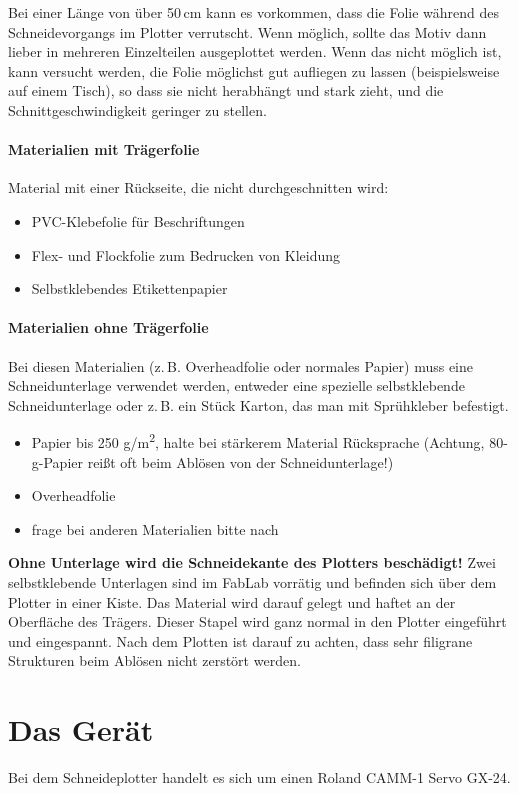 \documentclass{\basedir/fablab-document}
\begin{document}
Bei einer Länge von über 50\,cm kann es vorkommen, dass die Folie während des Schneidevorgangs im Plotter verrutscht.
Wenn möglich, sollte das Motiv dann lieber in mehreren Einzelteilen ausgeplottet werden.
Wenn das nicht möglich ist, kann versucht werden, die Folie möglichst gut aufliegen zu lassen (beispielsweise auf einem Tisch), so dass sie nicht herabhängt und stark zieht, und die Schnittgeschwindigkeit geringer zu stellen.


\paragraph{Materialien mit Trägerfolie}
Material mit einer Rückseite, die nicht durchgeschnitten wird:
\begin{itemize}
 \item PVC-Klebefolie für Beschriftungen
 \item Flex- und Flockfolie zum Bedrucken von Kleidung
 \item Selbstklebendes Etikettenpapier
\end{itemize}

\paragraph{Materialien ohne Trägerfolie}


Bei diesen Materialien (z.\,B. Overheadfolie oder normales Papier) muss eine Schneidunterlage verwendet werden,
entweder eine spezielle selbstklebende Schneidunterlage oder z.\,B. ein Stück Karton, das man mit Sprühkleber befestigt.  
\begin{itemize}
 \item Papier bis 250 \si{g/m^2}, halte bei stärkerem Material Rücksprache (Achtung, 80-g-Papier reißt oft beim Ablösen von der Schneidunterlage!)
 \item Overheadfolie
 \item frage bei anderen Materialien bitte nach
\end{itemize}

\textbf{Ohne Unterlage wird die Schneidekante des Plotters beschädigt!}
Zwei selbstklebende Unterlagen sind im FabLab vorrätig und befinden sich über dem Plotter in einer Kiste.
Das Material wird darauf gelegt und haftet an der Oberfläche des Trägers.
Dieser Stapel wird ganz normal in den Plotter eingeführt und eingespannt.
Nach dem Plotten ist darauf zu achten, dass sehr filigrane Strukturen beim Ablösen nicht zerstört werden.

\section{Das Gerät}
Bei dem Schneideplotter handelt es sich um einen Roland CAMM-1 Servo GX-24.
\end{document}
